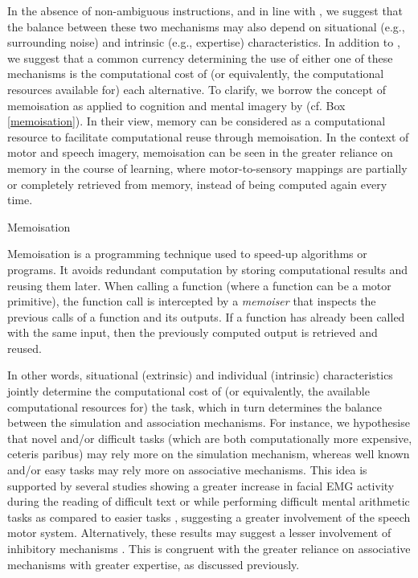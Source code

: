 \documentclass[utf8]{template/frontiersSCNS} %
\begin{document}
In the absence of non-ambiguous instructions, and in line with \cite{tian_mental_2012}, we suggest that the balance between these two mechanisms may also depend on situational (e.g., surrounding noise) and intrinsic (e.g., expertise) characteristics. In addition to \cite{tian_mental_2012}, we suggest that a common currency determining the use of either one of these mechanisms is the computational cost of (or equivalently, the computational resources available for) each alternative. To clarify, we borrow the concept of memoisation as applied to cognition and mental imagery by \cite{dasgupta_memory_2021} (cf. Box \ref{memoisation}). In their view, memory can be considered as a computational resource to facilitate computational reuse through memoisation. In the context of motor and speech imagery, memoisation can be seen in the greater reliance on memory in the course of learning, where motor-to-sensory mappings are partially or completely retrieved from memory, instead of being computed again every time.


\begin{mybox}[label = memoisation]{Memoisation}

Memoisation is a programming technique used to speed-up algorithms or programs. It avoids redundant computation by storing computational results and reusing them later. When calling a function (where a function can be a motor primitive), the function call is intercepted by a \textit{memoiser} that inspects the previous calls of a function and its outputs. If a function has already been called with the same input, then the previously computed output is retrieved and reused.

\end{mybox}

In other words, situational (extrinsic) and individual (intrinsic) characteristics jointly determine the computational cost of (or equivalently, the available computational resources for) the task, which in turn determines the balance between the simulation and association mechanisms. For instance, we hypothesise that novel and/or difficult tasks (which are both computationally more expensive, ceteris paribus) may rely more on the simulation mechanism, whereas well known and/or easy tasks may rely more on associative mechanisms. This idea is supported by several studies showing a greater increase in facial EMG activity during the reading of difficult text or while performing difficult mental arithmetic tasks as compared to easier tasks \citep[e.g.,][]{faaborg-andersen_electromyography_1958, sokolov_inner_1972}, suggesting a greater involvement of the speech motor system. Alternatively, these results may suggest a lesser involvement of inhibitory mechanisms \citep[see also the discussion in][]{nalborczyk_understanding_2019-1, nalborczyk_re-analysing_2020}. This is congruent with the greater reliance on associative mechanisms with greater expertise, as discussed previously.
\end{document}
